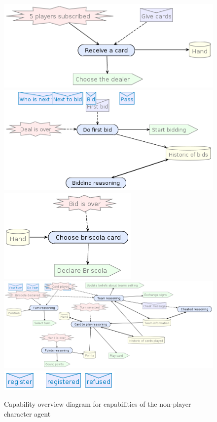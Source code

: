 \documentclass[a4paper]{article}
\begin{document}
\begin{figure}[htp]
  \includegraphics[keepaspectratio,scale=0.45]{pdt/images/detailed_design/receive_a_hand_capability_overview_diagram.png}
  \includegraphics[keepaspectratio,scale=0.45]{pdt/images/detailed_design/bidding_capability_overview_diagram.png}
  \includegraphics[keepaspectratio,scale=0.45]{pdt/images/detailed_design/declare_briscola_capability_overview_diagram.png}
  \includegraphics[keepaspectratio,scale=0.45]{pdt/images/detailed_design/playing_capability_overview_diagram.png}
  \includegraphics[keepaspectratio,scale=0.45]{pdt/images/detailed_design/join_to_game_capability_overview_diagram.png}
  \label{fig:non-player-cap}
  \caption{Capability overview diagram for capabilities of the non-player character agent}
\end{figure}
\end{document}

